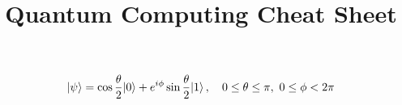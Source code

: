 \documentclass[12pt]{article}
\title{\vspace{-1.2cm}Quantum Computing Cheat Sheet}
\date{}
\begin{document}
\begin{equation*}
	{\left\vert{\psi}\right\rangle} = \cos{\frac{\theta}{2}} {\left\vert{0}\right\rangle} + e^{i\phi} \sin{\frac{\theta}{2}} {\left\vert{1}\right\rangle} \, ,
	\quad
	0 \le \theta \le \pi, \
	0 \le \phi < 2\pi
\end{equation*}
\end{document}
